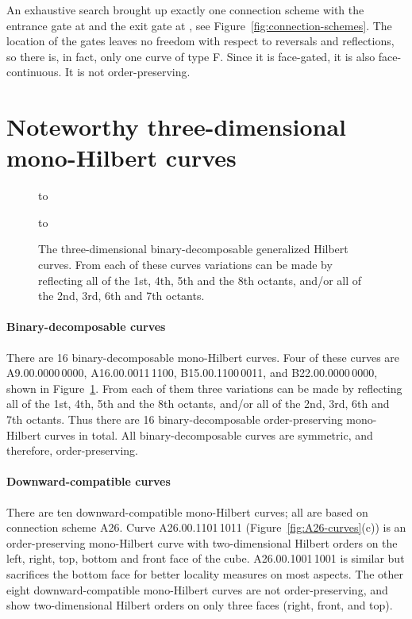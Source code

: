 \documentclass[11pt,a4paper]{article}
\begin{document}
An exhaustive search brought up exactly one connection scheme with the entrance gate at  and the exit gate at , see Figure~\ref{fig:connection-schemes}. The location of the gates leaves no freedom with respect to reversals and reflections, so there is, in fact, only one curve of type F. Since it is face-gated, it is also face-continuous. It is not order-preserving.

\section{Noteworthy three-dimensional mono-Hilbert curves}

\begin{figure}
\centering
\hbox to \hsize{\hfill
\texttt{[image: A9-00-00]}\hfill
\texttt{[image: A16-00-3c]}\hfill
}

\addvspace\baselineskip
\hbox to \hsize{\hfill
\texttt{[image: B15-00-c3]}\hfill
\texttt{[image: B22-00-00]}\hfill
}
\caption{The three-dimensional binary-decomposable generalized Hilbert curves. From each of these curves variations can be made by reflecting all of the 1st, 4th, 5th and the 8th octants, and/or all of the 2nd, 3rd, 6th and 7th octants.}
\label{fig:decomposable-curves}
\end{figure}

\paragraph{Binary-decomposable curves}\label{sec:binary-decomposable}
There are 16 binary-decomposable mono-Hilbert curves. Four of these curves are A9.00.0000\,0000, A16.00.0011\,1100, B15.00.1100\,0011, and B22.00.0000\,0000, shown in Figure~\ref{fig:decomposable-curves}. From each of them three variations can be made by reflecting all of the 1st, 4th, 5th and the 8th octants, and/or all of the 2nd, 3rd, 6th and 7th octants. Thus there are 16 binary-decomposable order-preserving mono-Hilbert curves in total. All binary-decomposable curves are symmetric, and therefore, order-preserving.

\paragraph{Downward-compatible curves}
There are ten downward-compatible mono-Hilbert curves; all are based on connection scheme A26.
Curve A26.00.1101\,1011 (Figure~\ref{fig:A26-curves}(c)) is an order-preserving mono-Hilbert curve with two-dimensional Hilbert orders on the left, right, top, bottom and front face of the cube.
A26.00.1001\,1001 is similar but sacrifices the bottom face for better locality measures on most aspects.
The other eight downward-compatible mono-Hilbert curves are not order-preserving, and show two-dimensional Hilbert orders on only three faces (right, front, and top).
\end{document}
